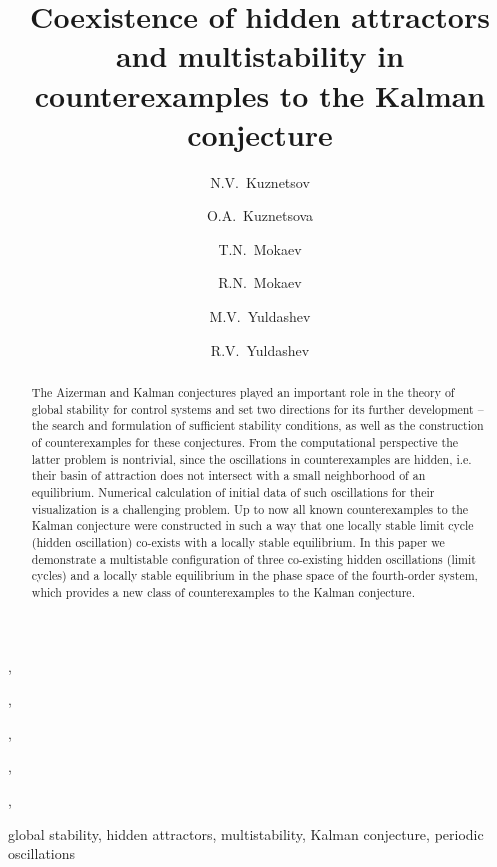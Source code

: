 \documentclass{ifacconf}
\theoremstyle{plain}
\begin{document}
\begin{frontmatter}

\title{Coexistence of hidden attractors and multistability in counterexamples to the Kalman conjecture}


\author[spbu,jyv,ipme]{N.V.~Kuznetsov},
\author[spbu]{O.A.~Kuznetsova},
\author[spbu]{T.N.~Mokaev},
\author[spbu,jyv]{R.N.~Mokaev},
\author[spbu]{M.V.~Yuldashev},
\author[spbu]{R.V.~Yuldashev}

\address[spbu]{Faculty of Mathematics and Mechanics, \\ St. Petersburg State University, Russia}
\address[jyv]{Dept. of Mathematical Information Technology,\\
University of Jyv\"{a}skyl\"{a}, Jyv\"{a}skyl\"{a}, Finland}
\address[ipme]{Institute for Problems in Mechanical Engineering RAS, Russia}

\begin{abstract}                %
The Aizerman and Kalman conjectures played an important role in
the theory of global stability for control systems
and set two directions for its further development --
the search and formulation of sufficient stability conditions,
as well as the construction of counterexamples for these conjectures.
From the computational perspective the latter problem is nontrivial,
since the oscillations in counterexamples are hidden,
i.e. their basin of attraction does not intersect with a small neighborhood of an equilibrium.
Numerical calculation of initial data of such oscillations for their visualization
is a challenging problem.
Up to now all known counterexamples to the Kalman conjecture were constructed in such a way
that one locally stable limit cycle (hidden oscillation) co-exists with a locally stable equilibrium.
In this paper we demonstrate a multistable configuration of three co-existing hidden oscillations
(limit cycles) and a locally stable equilibrium
in the phase space of the fourth-order system, which provides
a new class of counterexamples to the Kalman conjecture.
\end{abstract}

\begin{keyword}
global stability, hidden attractors, multistability, Kalman conjecture, periodic oscillations
\end{keyword}

\end{frontmatter}
\end{document}
